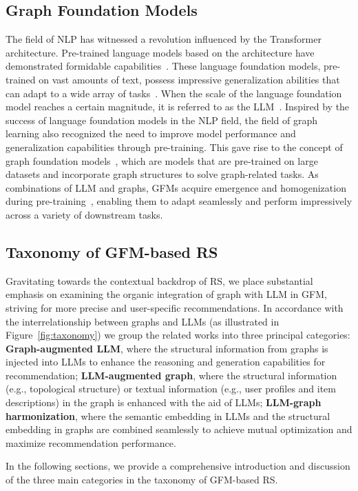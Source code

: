 \subsection{Graph Foundation Models}
The field of NLP has witnessed a revolution influenced by the Transformer architecture. Pre-trained language models based on the architecture have demonstrated formidable capabilities~\cite{radford2019language,kenton2019bert}. These language foundation models, pre-trained on vast amounts of text, possess impressive generalization abilities that can adapt to a wide array of tasks~\cite{bommasani2021opportunities}. When the scale of the language foundation model reaches a certain magnitude, it is referred to as the LLM~\cite{zhao2023survey}.
Inspired by the success of language foundation models in the NLP field, the field of graph learning also recognized the need to improve model performance and generalization capabilities through pre-training. This gave rise to the concept of graph foundation models~\cite{liu2023towards}, which are models that are pre-trained on large datasets and incorporate graph structures to solve graph-related tasks.
As combinations of LLM and graphs, GFMs acquire emergence and homogenization during pre-training~\cite{liu2023towards}, enabling them to adapt seamlessly and perform impressively across a variety of downstream tasks.

\subsection{Taxonomy of GFM-based RS}
Gravitating towards the contextual backdrop of RS, we place substantial emphasis on examining the organic integration of graph with LLM in GFM, striving for more precise and user-specific recommendations. In accordance with the interrelationship between graphs and LLMs (as illustrated in Figure~\ref{fig:taxonomy}) we group the related works into three principal categories:
\textbf{Graph-augmented LLM}, where the structural information from graphs is injected into LLMs to enhance the reasoning and generation capabilities for recommendation; 
\textbf{LLM-augmented graph}, where the structural information (e.g., topological structure) or textual information (e.g., user profiles and item descriptions) in the graph is enhanced with the aid of LLMs; 
\textbf{LLM-graph harmonization}, where the semantic embedding in LLMs and the structural embedding in graphs are combined seamlessly to achieve mutual optimization and maximize recommendation performance. 

In the following sections, we provide a comprehensive introduction and discussion of the three main categories in the taxonomy of GFM-based RS.

